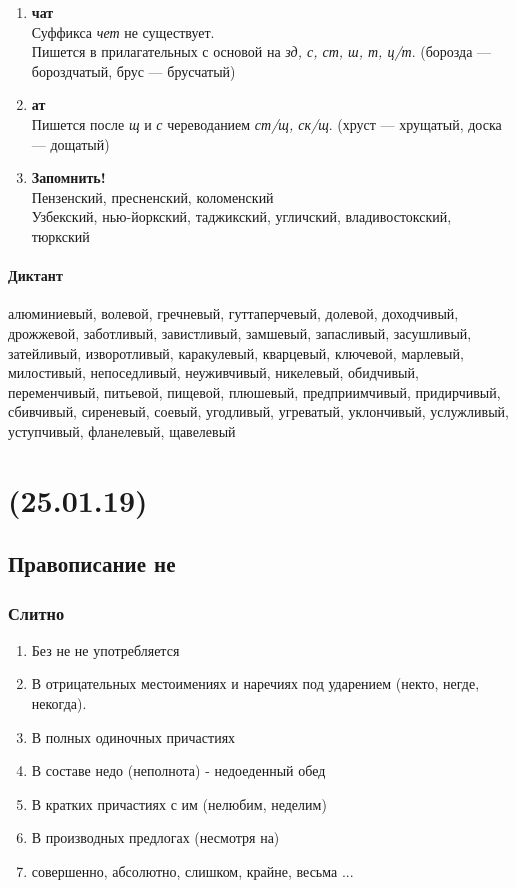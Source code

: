 \documentclass{article}
\begin{document}
\begin{enumerate}
\item
  \textbf{чат}\\
  Суффикса \emph{чет} не существует.\\
  Пишется в прилагательных с основой на \emph{зд, с, ст, ш, т, ц/т}. (борозда --- бороздчатый, брус --- брусчатый)

\item
  \textbf{ат}\\
  Пишется после \emph{щ} и \emph{с} череводанием \emph{ст/щ, ск/щ}. (хруст --- хрущатый, доска --- дощатый)

\item
  \textbf{Запомнить!}\\
  Пензенский, пресненский, коломенский\\
  Узбекский, нью-йоркский, таджикский, угличский, владивостокский, тюркский
\end{enumerate}


\paragraph{Диктант} алюминиевый, волевой, гречневый, гуттаперчевый, долевой, доходчивый, дрожжевой, заботливый,
завистливый, замшевый, запасливый, засушливый, затейливый, изворотливый, каракулевый, кварцевый, ключевой, марлевый,
милостивый, непоседливый, неуживчивый, никелевый, обидчивый, переменчивый, питьевой, пищевой, плюшевый, предприимчивый,
придирчивый, сбивчивый, сиреневый, соевый, угодливый, угреватый, уклончивый, услужливый, уступчивый, фланелевый, щавелевый

\newpage
\noindent\makebox[\linewidth]{\rule{\paperwidth}{0.4pt}}
\section{(25.01.19)}
\noindent\makebox[\linewidth]{\rule{\paperwidth}{0.4pt}}

\subsection{Правописание не}

\subsubsection{Слитно}

\begin{enumerate}
\item
  Без не не употребляется  
\item
  В отрицательных местоимениях и наречиях под ударением (некто, негде, некогда).
\item
  В полных одиночных причастиях
\item
  В составе недо (неполнота) - недоеденный обед
\item
  В кратких причастиях с им (нелюбим, неделим)
\item
  В производных предлогах (несмотря на)
\item
  совершенно, абсолютно, слишком, крайне, весьма ...
\end{enumerate}
\end{document}
